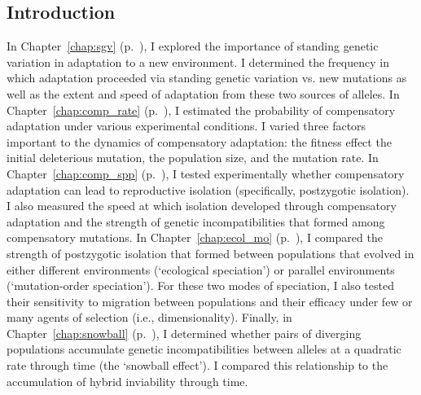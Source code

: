 \begin{doublespace}

\chapter*{Introduction}


In Chapter~\ref{chap:sgv} (p.~\pageref{chap:sgv}),
I explored the importance of standing genetic variation
in adaptation to a new environment.
%
I determined the frequency in which adaptation
proceeded via standing genetic variation vs. new mutations
as well as the extent and speed of adaptation
from these two sources of alleles.
%
In Chapter~\ref{chap:comp_rate} (p.~\pageref{chap:comp_rate}),
I estimated the probability of compensatory adaptation
under various experimental conditions.
%
I varied three factors important to the dynamics of compensatory adaptation:
the fitness effect the initial deleterious mutation,
the population size, and the mutation rate.
%
In Chapter~\ref{chap:comp_spp} (p.~\pageref{chap:comp_spp}),
I tested experimentally whether compensatory adaptation
can lead to reproductive isolation (specifically, postzygotic isolation).
%
I also measured the speed at which isolation developed
through compensatory adaptation and the strength of genetic incompatibilities
that formed among compensatory mutations.
%
In Chapter~\ref{chap:ecol_mo} (p.~\pageref{chap:ecol_mo}),
I compared the strength of postzygotic isolation that formed
between populations that evolved in either different environments
(`ecological speciation') or parallel environments
(`mutation-order speciation').
%
For these two modes of speciation,
I also tested their sensitivity to migration between populations
and their efficacy under few or many agents of selection (i.e., dimensionality).
%
Finally, in Chapter~\ref{chap:snowball} (p.~\pageref{chap:snowball}),
I determined whether pairs of diverging populations accumulate
genetic incompatibilities between alleles at a quadratic rate through time
(the `snowball effect').
%
I compared this relationship to the accumulation of hybrid inviability
through time.

\end{doublespace}
